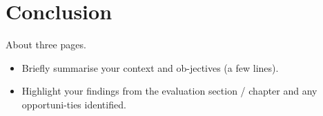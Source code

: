 \chapter{Conclusion}
About three pages.

\begin{itemize}
\item Briefly summarise your context and ob-jectives (a few lines).
\item Highlight your findings from the evaluation section / chapter and any opportuni-ties identified.
\end{itemize}
